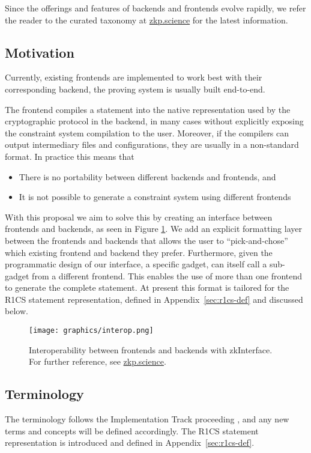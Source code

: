 \documentclass[a4paper,12pt]{article}
\begin{document}
Since the offerings and features of backends and frontends evolve rapidly, we refer the reader to the curated taxonomy at \href{https://zkp.science}{zkp.science} for the latest information.  

 

\subsection{Motivation}

Currently, existing frontends are implemented to work best with their corresponding backend, the proving system is usually built end-to-end.

The frontend compiles a statement into the native representation used by the cryptographic protocol in the backend, in many cases without explicitly exposing the constraint system compilation to the user. Moreover, if the compilers can output intermediary files and configurations, they are usually in a non-standard format. In practice this means that
\begin{itemize}
	\item There is no portability between different backends and frontends, and
	\item It is not possible to generate a constraint system using different frontends
\end{itemize}   

With this proposal we aim to solve this by creating an interface between frontends and backends, as seen in Figure \ref{interface}. We add an explicit formatting layer between the frontends and backends that allows the user to ``pick-and-chose'' which existing frontend and backend they prefer. Furthermore, given the programmatic design of our interface, a specific gadget, can itself call a sub-gadget from a different frontend. This enables the use of more than one frontend to generate the complete statement. At present this format is tailored for the R1CS statement representation, defined in Appendix~\ref{sec:r1cs-def} and discussed below.

\begin{figure}[h!]
	\texttt{[image: graphics/interop.png]}
	\caption{Interoperability between frontends and backends with zkInterface. For further reference, see \href{https://zkp.science}{zkp.science}.}
	\label{interface}
\end{figure}

\subsection{Terminology}
The terminology follows the Implementation Track proceeding \cite{ZKProofImplementation}, and any new terms and concepts will be defined accordingly. The R1CS statement representation is introduced and defined in Appendix~\ref{sec:r1cs-def}.
\end{document}

